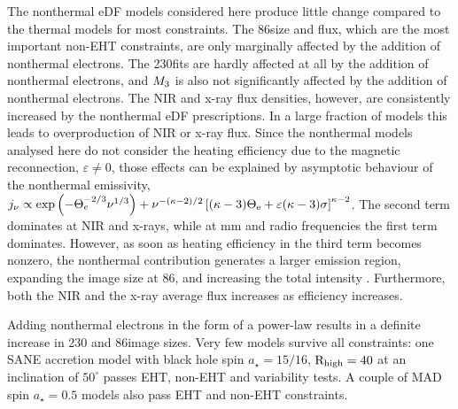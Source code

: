 {The nonthermal eDF models considered here produce little change compared to the thermal models for most constraints.  The 86\GHz size and flux, which are the most important non-EHT constraints, are only marginally affected by the addition of nonthermal electrons.
The 230\GHz \mring fits are hardly affected at all by the addition of nonthermal electrons, and $M_{3}$ is also not significantly affected by the addition of nonthermal electrons.  The NIR and x-ray flux densities, however, are consistently increased by the nonthermal eDF prescriptions.  In a large fraction of models this leads to overproduction of NIR or x-ray flux. Since the nonthermal models analysed here do not consider the heating efficiency due to the magnetic reconnection, $\varepsilon \neq 0$, those effects can be explained by asymptotic behaviour of the nonthermal emissivity, $ j_{\nu}\propto\exp\left(-\Theta_e^{-2/3}\nu^{1/3}\right)+\nu^{-(\kappa-2)/2} \left[(\kappa -3)\Theta_{\rm e} + \varepsilon(\kappa -3) \sigma\right]^{\kappa-2}$. The second term dominates at NIR and x-rays, while at mm and radio frequencies the first term dominates. However, as soon as heating efficiency in the third term becomes nonzero, the nonthermal contribution generates a larger emission region, expanding the image size at 86\GHz,  and increasing the total intensity \citep{2021NatAs.tmp..218C,2021arXiv211102518F}. Furthermore, both the NIR and the x-ray average flux increases as efficiency increases.


Adding nonthermal electrons in the form of a power-law results in a definite increase in 230 and 86\GHz image sizes. Very few models survive all constraints: one SANE accretion model with black hole spin $a_{\star}=15/16$, $\rm R_{high}=40$ at an inclination of $50^{\circ}$ passes EHT, non-EHT and variability tests. A couple of MAD spin $a_{\star}=0.5$ models also pass EHT and non-EHT constraints.


}
